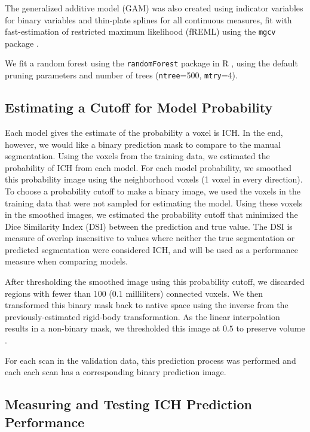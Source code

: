 \documentclass{elsarticle_nonatbib}\usepackage[]{graphicx}\usepackage[]{color}
\newcommand{\pkg}[1]{\texttt{#1}}
\begin{document}
The generalized additive model (GAM) \citep{hastie_generalized_1986, hastie_generalized_1990} was also created using indicator variables for binary variables and thin-plate splines for all continuous measures, fit with fast-estimation of restricted maximum likelihood (fREML) using the \pkg{mgcv} package \citep{wood_fast_2011, wood_generalized_2015}.  


We fit a random forest \citep{breiman2001random} using the \pkg{randomForest} package in R \citep{randomForest}, using the default pruning parameters and number of trees (\verb|ntree|=500, \verb|mtry|=4). 



\subsection{Estimating a Cutoff for Model Probability}

Each model gives the estimate of the probability a voxel is ICH.  In the end, however, we would like a binary prediction mask to compare to the manual segmentation. 
Using the voxels from the training data, we estimated the probability of ICH from each model.  For each model probability, we smoothed this probability image using the neighborhood voxels (1 voxel in every direction).  To choose a probability cutoff to make a binary image, we used the voxels in the training data that were not sampled for estimating the model.  Using these voxels in the smoothed images, we estimated the probability cutoff that minimized the Dice Similarity Index (DSI) \citep{dice_measures_1945} between the prediction and true value.   The DSI is measure of overlap insensitive to values where neither the true segmentation or predicted segmentation were considered ICH, and will be used as a performance measure when comparing models.

After thresholding the smoothed image using this probability cutoff, we discarded regions with fewer than 100 ($0.1$ milliliters) connected voxels.  We then transformed this binary mask back to native space using the inverse from the previously-estimated rigid-body transformation.  As the linear interpolation results in a non-binary mask, we thresholded this image at $0.5$ to preserve volume \cite{flirt_reg}.  

For each scan in the validation data, this prediction process was performed and each each scan has a corresponding binary prediction  image.


\subsection{Measuring and Testing ICH Prediction Performance}
\end{document}
